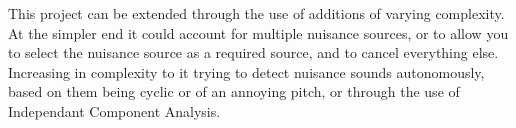 \label{scope}
This project can be extended through the use of additions of varying complexity. At the simpler end it could account for multiple nuisance sources, or to allow you to select the nuisance source as a required source, and to cancel everything else. Increasing in complexity to it trying to detect nuisance sounds autonomously, based on them being cyclic or of an annoying pitch, or through the use of Independant Component Analysis.
